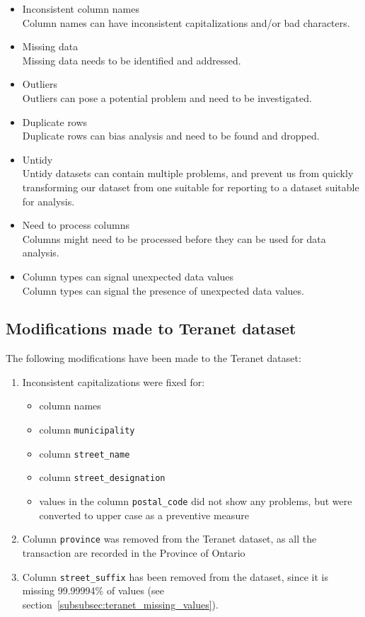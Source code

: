 \documentclass[11pt]{article}
\begin{document}
    \begin{itemize}
        \item Inconsistent column names \\
        Column names can have inconsistent capitalizations and/or bad characters.
        \item Missing data \\
        Missing data needs to be identified and addressed.
        \item Outliers \\
        Outliers can pose a potential problem and need to be investigated.
        \item Duplicate rows \\
        Duplicate rows can bias analysis and need to be found and dropped.
        \item Untidy \\
        Untidy datasets can contain multiple problems, and prevent us from quickly transforming our dataset from one suitable for reporting to a dataset suitable for analysis.
        \item Need to process columns \\
        Columns might need to be processed before they can be used for data analysis.
        \item Column types can signal unexpected data values \\
        Column types can signal the presence of unexpected data values.
    \end{itemize}

    \subsection{Modifications made to Teranet dataset} \label{subsec:teranet_modifications}

    The following modifications have been made to the Teranet dataset:

    \begin{enumerate}
        \item Inconsistent capitalizations were fixed for:
        \begin{itemize}
            \item column names
            \item column \texttt{municipality}
            \item column \texttt{street\_name}
            \item column \texttt{street\_designation}
            \item values in the column \texttt{postal\_code} did not show any problems, but were converted to upper case as a preventive measure
        \end{itemize}
        \item Column \texttt{province} was removed from the Teranet dataset, as all the transaction are recorded in the Province of Ontario
        \item Column \texttt{street\_suffix} has been removed from the dataset, since it is missing 99.99994\% of values (see section~\ref{subsubsec:teranet_missing_values}).
    \end{enumerate}
\end{document}
